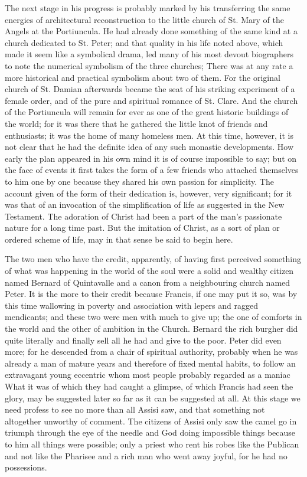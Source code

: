 \documentclass{book}
\begin{document}
The next stage in his progress is probably marked by his transferring the same energies of architectural reconstruction to the little church of St. Mary of the Angels at the Portiuncula. He had already done something of the same kind at a church dedicated to St. Peter; and that quality in his life noted above, which made it seem like a symbolical drama, led many of his most devout biographers to note the numerical symbolism of the three churches; There was at any rate a more historical and practical symbolism about two of them. For the original church of St. Damian afterwards became the seat of his striking experiment of a female order, and of the pure and spiritual romance of St. Clare. And the church of the Portiuncula will remain for ever as one of the great historic buildings of the world; for it was there that he gathered the little knot of friends and enthusiasts; it was the home of many homeless men. At this time, however, it is not clear that he had the definite idea of any such monastic developments. How early the plan appeared in his own mind it is of course impossible to say; but on the face of events it first takes the form of a few friends who attached themselves to him one by one because they shared his own passion for simplicity. The account given of the form of their dedication is, however, very significant; for it was that of an invocation of the simplification of life as suggested in the New Testament. The adoration of Christ had been a part of the man’s passionate nature for a long time past. But the imitation of Christ, as a sort of plan or ordered scheme of life, may in that sense be said to begin here.

The two men who have the credit, apparently, of having first perceived something of what was happening in the world of the soul were a solid and wealthy citizen named Bernard of Quintavalle and a canon from a neighbouring church named Peter. It is the more to their credit because Francis, if one may put it so, was by this time wallowing in poverty and association with lepers and ragged mendicants; and these two were men with much to give up; the one of comforts in the world and the other of ambition in the Church. Bernard the rich burgher did quite literally and finally sell all he had and give to the poor. Peter did even more; for he descended from a chair of spiritual authority, probably when he was already a man of mature years and therefore of fixed mental habits, to follow an extravagant young eccentric whom most people probably regarded as a maniac What it was of which they had caught a glimpse, of which Francis had seen the glory, may be suggested later so far as it can be suggested at all. At this stage we need profess to see no more than all Assisi saw, and that something not altogether unworthy of comment. The citizens of Assisi only saw the camel go in triumph through the eye of the needle and God doing impossible things because to him all things were possible; only a priest who rent his robes like the Publican and not like the Pharisee and a rich man who went away joyful, for he had no possessions.
\end{document}
